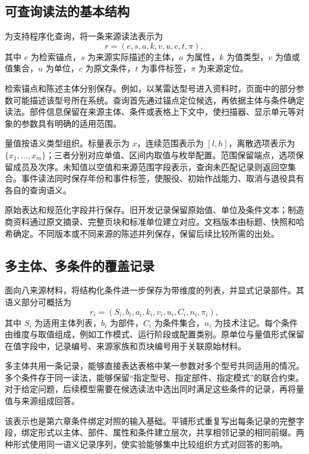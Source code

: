 \subsection{可查询读法的基本结构}

为支持程序化查询，将一条来源读法表示为
\begin{equation}
 r=(e,s,a,k,v,u,c,t,\pi),
\label{eq:radar-reading}
\end{equation}
其中 $e$ 为检索锚点，$s$ 为来源实际描述的主体，$a$ 为属性，$k$ 为值类型，$v$ 为值或值集合，$u$ 为单位，$c$ 为原文条件，$t$ 为事件标签，$\pi$ 为来源定位。

检索锚点和陈述主体分别保存。例如，以某雷达型号进入资料时，页面中的部分参数可能描述该型号所在系统。查询首先通过锚点定位候选，再依据主体与条件确定读法。部件信息保留在来源主体、条件或表格上下文中，使扫描器、显示单元等对象的参数具有明确的适用范围。

量值按语义类型组织。标量表示为 $x$，连续范围表示为 $[l,h]$，离散选项表示为 $\{x_1,\ldots,x_m\}$；三者分别对应单值、区间内取值与枚举配置。范围保留端点，选项保留成员及次序。未知值以空值和来源范围字段表示，查询未匹配记录则返回空集合。事件读法同时保存年份和事件标签，使服役、初始作战能力、取消与退役具有各自的查询语义。

原始表达和规范化字段并行保存。旧开发记录保留原始值、单位及条件文本；制造商资料通过原文摘录、完整页块和标准单位建立对应。文档版本由标题、快照和哈希确定。不同版本或不同来源的陈述并列保存，保留后续比较所需的出处。

\subsection{多主体、多条件的覆盖记录}

面向八来源材料，将结构化条件进一步保存为带维度的列表，并显式记录部件。其语义部分可概括为
\begin{equation}
 r_i=(S_i,b_i,a_i,k_i,v_i,u_i,C_i,n_i,\pi_i),
\label{eq:radar-coverage-reading}
\end{equation}
其中 $S_i$ 为适用主体列表，$b_i$ 为部件，$C_i$ 为条件集合，$n_i$ 为技术注记。每个条件由维度与取值组成，例如工作模式、运行阶段或配置类别。原单位与量值形式保留在值字段中，记录编号、来源家族和页块编号用于关联原始材料。

多主体共用一条记录，能够直接表达表格中某一参数对多个型号共同适用的情况。多个条件存于同一读法，能够保留“指定型号、指定部件、指定模式”的联合约束。对于给定问题，后续模型需要在候选读法中选出同时满足这些条件的记录，再将量值与来源组成回答。

该表示也是第六章条件绑定对照的输入基础。平铺形式重复写出每条记录的完整字段，绑定形式以主体、部件、属性和条件建立层次，共享相邻记录的相同前缀。两种形式使用同一语义记录序列，使实验能够集中比较组织方式对回答的影响。

